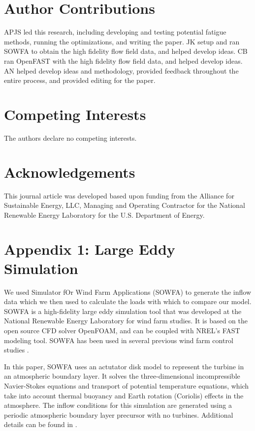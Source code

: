 \documentclass[11pt,letterpaper]{article}
\begin{document}
\section*{Author Contributions}
APJS led this research, including developing and testing potential fatigue methods, running the optimizations, and writing the paper. JK setup and ran SOWFA to obtain the high fidelity flow field data, and helped develop ideas. CB ran OpenFAST with the high fidelity flow field data, and helped develop ideas. AN helped develop ideas and
methodology, provided feedback throughout the entire process, and
provided editing for the paper.

\section*{Competing Interests}
The authors declare no competing interests.

\section*{Acknowledgements}

This journal article was developed based upon funding from the Alliance for Sustainable Energy, LLC, Managing and Operating Contractor for the National Renewable Energy Laboratory for the U.S. Department of Energy.

\FloatBarrier



\newpage
\section*{Appendix 1: Large Eddy Simulation}
\label{sec:les}

We used Simulator fOr Wind Farm Applications (SOWFA) to generate the inflow data which we then used to calculate the loads with which to compare our model.  SOWFA is a high-fidelity large eddy simulation tool that was developed at the National Renewable Energy Laboratory for wind farm studies.  It is based on the open source CFD solver OpenFOAM, and can be coupled with NREL's FAST modeling tool.  SOWFA has been used in several previous wind farm control studies \cite{fleming2013sowfa,fleming2015simulation,gebraad2016wind}.  

In this paper, SOWFA uses an actutator disk model to represent the turbine in an atmospheric boundary layer.  It solves the three-dimensional incompressible Navier-Stokes equations and transport of potential temperature equations, which take into account thermal buoyancy and Earth rotation (Coriolis) effects in the atmosphere.  The inflow conditions for this simulation are generated using a periodic atmospheric boundary layer precursor with no turbines.  Additional details can be found in \cite{fleming2013sowfa}. 
\end{document}
